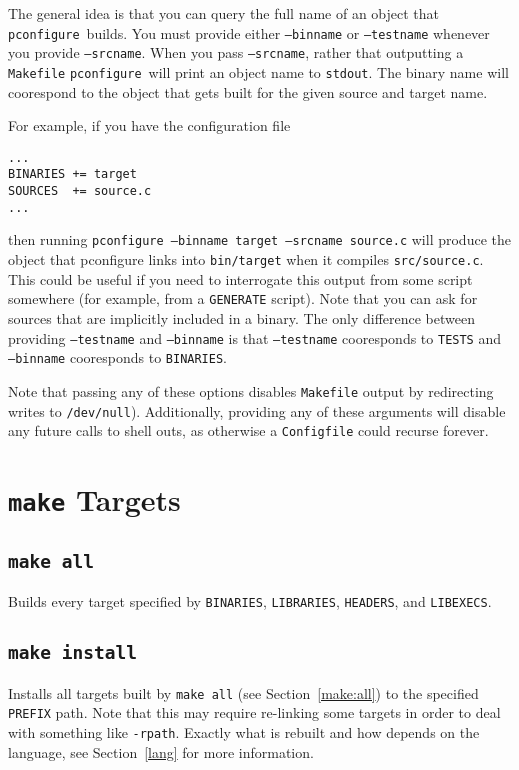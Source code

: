 \documentclass{article}
\newcommand{\pconfigure}{\texttt{pconfigure}}
\begin{document}
The general idea is that you can query the full name of an object that
\pconfigure\ builds.  You must provide either \texttt{--binname} or
\texttt{--testname} whenever you provide \texttt{--srcname}.  When you
pass \texttt{--srcname}, rather that outputting a \texttt{Makefile}
\pconfigure\ will print an object name to \texttt{stdout}.  The binary
name will coorespond to the object that gets built for the given
source and target name.

For example, if you have the configuration file
\begin{verbatim}
...
BINARIES += target
SOURCES  += source.c
...
\end{verbatim}
then running \texttt{pconfigure --binname target --srcname source.c}
will produce the object that pconfigure links into \texttt{bin/target}
when it compiles \texttt{src/source.c}.  This could be useful if you
need to interrogate this output from some script somewhere (for
example, from a \texttt{GENERATE} script).  Note that you can ask for
sources that are implicitly included in a binary.  The only difference
between providing \texttt{--testname} and \texttt{--binname} is that
\texttt{--testname} cooresponds to \texttt{TESTS} and
\texttt{--binname} cooresponds to \texttt{BINARIES}.

Note that passing any of these options disables \texttt{Makefile}
output by redirecting writes to \texttt{/dev/null}).  Additionally,
providing any of these arguments will disable any future calls to
shell outs, as otherwise a \texttt{Configfile} could recurse forever.

\section{\texttt{make} Targets \label{make}}

\subsection{\texttt{make all} \label{make:all}}

Builds every target specified by \texttt{BINARIES},
\texttt{LIBRARIES}, \texttt{HEADERS}, and \texttt{LIBEXECS}.

\subsection{\texttt{make install} \label{make:install}}

Installs all targets built by \texttt{make all} (see
Section~\ref{make:all}) to the specified \texttt{PREFIX} path.  Note
that this may require re-linking some targets in order to deal with
something like \texttt{-rpath}.  Exactly what is rebuilt and how
depends on the language, see Section~\ref{lang} for more information.
\end{document}
